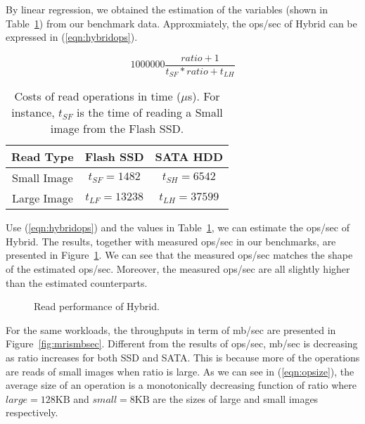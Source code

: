 By linear regression, we obtained the estimation of the variables
(shown in Table~\ref{tbl:variable}) from our benchmark data.
Approxmiately, the ops/sec of Hybrid can be expressed in
(\ref{eqn:hybridops}).

\begin{equation}
\label{eqn:hybridops}
    1000000 \frac{ratio + 1}{t_{SF} * ratio + t_{LH}}
\end{equation}

\begin{table}[tc]
{\centering \footnotesize
\begin{tabular}{c|c|c}
\hline 
  Read Type & Flash SSD & SATA HDD \\ \hline
  Small Image & $t_{SF} = 1482$ & $t_{SH} = 6542$ \\ 
  Large Image & $t_{LF} = 13238$ & $t_{LH} = 37599$ \\ \hline
\end{tabular}
 \caption{Costs of read operations in time ($\mu$s). For instance,
$t_{SF}$ is the time of reading a Small image from the Flash SSD.}
\label{tbl:variable}
}
\end{table}

Use (\ref{eqn:hybridops}) and the values in Table~\ref{tbl:variable},
we can estimate the ops/sec of Hybrid. The results, together with
measured ops/sec in our benchmarks, are presented in
Figure~\ref{fig:readesti}. We can see that the measured ops/sec
matches the shape of the estimated ops/sec. Moreover, the measured
ops/sec are all slightly higher than the estimated counterparts.


\begin{figure}[t]
\begin{centering}
\caption{Read performance of Hybrid.}
\label{fig:readesti}
\end{centering}
\end{figure}

For the same workloads, the throughputs in term of mb/sec are
presented in Figure~\ref{fig:mrismbsec}. Different from the results of
ops/sec, mb/sec is decreasing as ratio increases for both SSD and
SATA. This is because more of the operations are reads of small images
when ratio is large. As we can see in (\ref{eqn:opsize}), the average
size of an operation is a monotonically decreasing function of ratio
where $large = 128\mbox{KB}$ and $small = 8\mbox{KB}$ are the sizes of
large and small images respectively.

